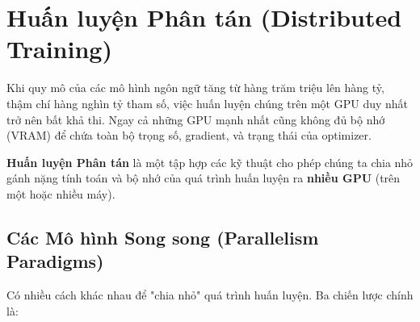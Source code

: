 
\section{Huấn luyện Phân tán (Distributed Training)}
\label{sec:distributed_training}

Khi quy mô của các mô hình ngôn ngữ tăng từ hàng trăm triệu lên hàng tỷ, thậm chí hàng nghìn tỷ tham số, việc huấn luyện chúng trên một GPU duy nhất trở nên bất khả thi. Ngay cả những GPU mạnh nhất cũng không đủ bộ nhớ (VRAM) để chứa toàn bộ trọng số, gradient, và trạng thái của optimizer.

\textbf{Huấn luyện Phân tán} là một tập hợp các kỹ thuật cho phép chúng ta chia nhỏ gánh nặng tính toán và bộ nhớ của quá trình huấn luyện ra \textbf{nhiều GPU} (trên một hoặc nhiều máy).

\subsection{Các Mô hình Song song (Parallelism Paradigms)}
\label{ssec:parallelism_paradigms}
Có nhiều cách khác nhau để "chia nhỏ" quá trình huấn luyện. Ba chiến lược chính là:

